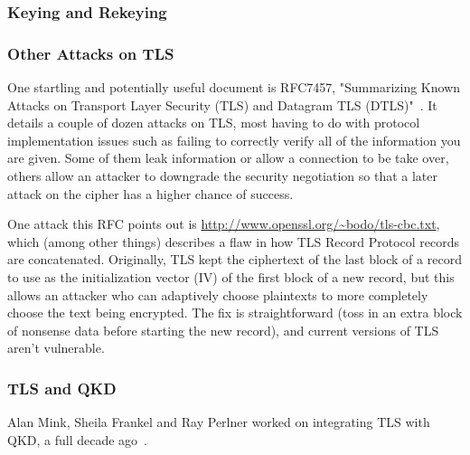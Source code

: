 \subsubsection{Keying and Rekeying}
\label{sec:tls-rekeying}





\subsubsection{Other Attacks on TLS}

One startling and potentially useful document is RFC7457, "Summarizing
Known Attacks on Transport Layer Security (TLS) and Datagram TLS
(DTLS)"~\cite{RFC7457}.  It details a couple of dozen attacks on TLS, most having to do
with protocol implementation issues such as failing to correctly
verify all of the information you are given.  Some of them leak
information or allow a connection to be take over, others allow an
attacker to downgrade the security negotiation so that a later attack
on the cipher has a higher chance of success.

One attack this RFC points out is
\url{http://www.openssl.org/~bodo/tls-cbc.txt}, which (among other things)
describes a flaw in how TLS Record Protocol records are concatenated.
Originally, TLS kept the ciphertext of the last block of a record to
use as the initialization vector (IV) of the first block of a new
record, but this allows an attacker who can adaptively choose
plaintexts to more completely choose the text being encrypted.  The
fix is straightforward (toss in an extra block of nonsense data before
starting the new record), and current versions of TLS aren't
vulnerable.

\subsubsection{TLS and QKD}

Alan Mink, Sheila Frankel and Ray Perlner worked on integrating TLS
with QKD, a full decade ago~\cite{mink09:_qkd_and_ipsec}.

